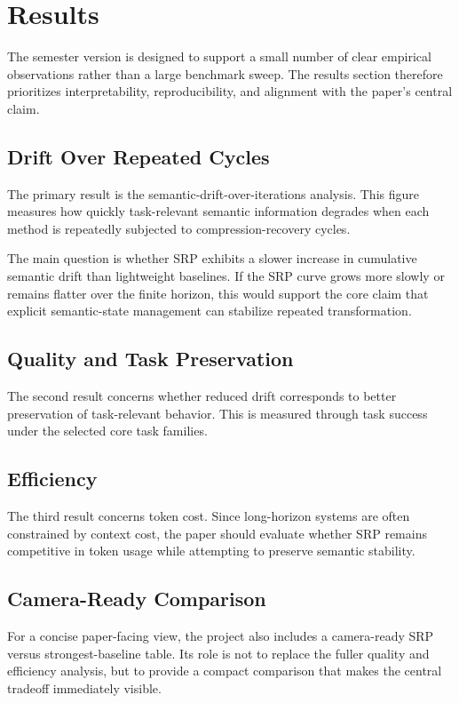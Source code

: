 \documentclass[11pt]{article}
\begin{document}
\section{Results}
The semester version is designed to support a small number of clear empirical observations rather than a large benchmark sweep. The results section therefore prioritizes interpretability, reproducibility, and alignment with the paper's central claim.

\subsection{Drift Over Repeated Cycles}

The primary result is the semantic-drift-over-iterations analysis. This figure measures how quickly task-relevant semantic information degrades when each method is repeatedly subjected to compression-recovery cycles.

The main question is whether SRP exhibits a slower increase in cumulative semantic drift than lightweight baselines. If the SRP curve grows more slowly or remains flatter over the finite horizon, this would support the core claim that explicit semantic-state management can stabilize repeated transformation.

\subsection{Quality and Task Preservation}

The second result concerns whether reduced drift corresponds to better preservation of task-relevant behavior. This is measured through task success under the selected core task families.

\subsection{Efficiency}

The third result concerns token cost. Since long-horizon systems are often constrained by context cost, the paper should evaluate whether SRP remains competitive in token usage while attempting to preserve semantic stability.

\subsection{Camera-Ready Comparison}

For a concise paper-facing view, the project also includes a camera-ready SRP versus strongest-baseline table. Its role is not to replace the fuller quality and efficiency analysis, but to provide a compact comparison that makes the central tradeoff immediately visible.
\end{document}
